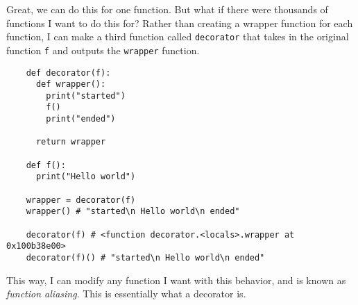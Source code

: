   Great, we can do this for one function. But what if there were thousands of functions I want to do this for? Rather than creating a wrapper function for each function, I can make a third function called \texttt{decorator} that takes in the original function \texttt{f} and outputs the \texttt{wrapper} function. 

  \begin{lstlisting}
    def decorator(f): 
      def wrapper(): 
        print("started") 
        f()
        print("ended") 

      return wrapper

    def f(): 
      print("Hello world") 

    wrapper = decorator(f)
    wrapper() # "started\n Hello world\n ended"

    decorator(f) # <function decorator.<locals>.wrapper at 0x100b38e00>
    decorator(f)() # "started\n Hello world\n ended"
  \end{lstlisting}

  This way, I can modify any function I want with this behavior, and is known as \textit{function aliasing}. This is essentially what a decorator is. 

